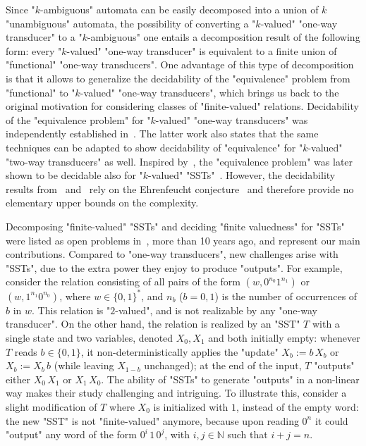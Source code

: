 \documentclass{theoretics}
\begin{document}
Since "$k$-ambiguous" automata can be easily 
decomposed into a  union of $k$ "unambiguous" automata,
the possibility of converting a "$k$-valued" "one-way transducer" 
to a "$k$-ambiguous" one   entails a decomposition result of the 
following form: every "$k$-valued" "one-way transducer" is equivalent
to a finite union of "functional" "one-way transducers".
One advantage of this type of decomposition is that it allows to generalize
the decidability of the "equivalence" problem from "functional" 
to "$k$-valued" "one-way transducers",
which brings us back to the original motivation for considering 
classes of "finite-valued" relations.
Decidability of the "equivalence problem" for
"$k$-valued" "one-way transducers" was independently established
in~\cite{ck86}.
The latter work also states that the same techniques can be adapted 
to show decidability of "equivalence" for "$k$-valued" 
"two-way transducers" as well.
Inspired by~\cite{ck86}, the "equivalence problem" was later shown 
to be decidable also for "$k$-valued" "SSTs"~\cite{equivalence-finite-valued}.
However, the decidability results from~\cite{ck86} and~\cite{equivalence-finite-valued} 
rely on the Ehrenfeucht conjecture~\cite{AL85,Guba86} and therefore provide no elementary
upper bounds on the complexity. 



Decomposing "finite-valued" "SSTs" and deciding
"finite valuedness" for "SSTs" were listed as open problems 
in~\cite{DBLP:conf/icalp/AlurD11}, more than 10 years ago,
and represent our main contributions.
Compared to "one-way transducers", new challenges arise with
"SSTs", due to the extra power they enjoy to produce "outputs". 
For example, consider the relation consisting of all pairs
of the form $(w, 0^{n_0}1^{n_1})$ or $(w, 1^{n_1}0^{n_0})$, 
where $w\in\{0,1\}^*$, and $n_b$ ($b=0,1$) is the number of 
occurrences of $b$ in $w$. 
This relation is "$2$-valued", and is not realizable by any "one-way transducer". 
On the other hand, the relation is realized by an "SST" $T$ with a single state 
and two variables, denoted $X_0,X_1$ and both initially empty: 
whenever $T$ reads $b\in\{0,1\}$,
it non-deterministically applies the "update" $X_b := b \,X_b$ or 
$X_b := X_b\,b$ (while leaving $X_{1-b}$ unchanged); at the end of
the input, $T$ "outputs" either $X_0 \, X_1$ or $X_1 \, X_0$. 
The ability of "SSTs" to generate "outputs" in a non-linear way
makes their study challenging and intriguing. To illustrate this, 
consider a slight modification of $T$ where
$X_0$ is initialized with $1$, instead of the empty word:
the new "SST" is not "finite-valued" anymore, because upon 
reading $0^n$ it could "output" any word of the form 
$0^i \,1 \, 0^j$, with $i,j\in\mathbb{N}$ such that $i+j = n$. 
\end{document}
